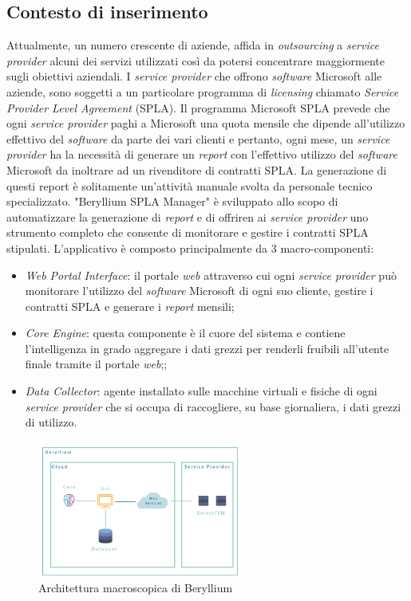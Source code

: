 \subsection{Contesto di inserimento}
Attualmente, un numero crescente di aziende, affida in \emph{outsourcing} a \emph{service provider} alcuni dei servizi utilizzati così da potersi concentrare maggiormente sugli obiettivi aziendali.
I \emph{service provider} che offrono \emph{software} Microsoft alle aziende, sono soggetti a un particolare programma di \emph{licensing} chiamato \emph{Service Provider Level Agreement} (SPLA).
Il programma Microsoft SPLA prevede che ogni \emph{service provider} paghi a Microsoft una quota mensile che dipende all'utilizzo effettivo del \emph{software} da parte dei vari clienti e pertanto, ogni mese, un \emph{service provider} ha la necessità di generare un \emph{report} con l'effettivo utilizzo del \emph{software} Microsoft da inoltrare ad un rivenditore di contratti SPLA.
La generazione di questi report è solitamente un'attività manuale svolta da personale tecnico specializzato. 
"Beryllium SPLA Manager" è sviluppato allo scopo di automatizzare la generazione di \emph{report} e di offriren ai \emph{service provider} uno strumento completo che consente di monitorare e gestire i contratti SPLA stipulati.
L'applicativo è composto principalmente da 3 macro-componenti:
\begin{itemize}
    \item \emph{Web Portal Interface}: il portale \emph{web} attraverso cui ogni \emph{service provider} può monitorare l'utilizzo del \emph{software} Microsoft di ogni suo cliente, gestire i contratti SPLA e generare i \emph{report} mensili;
    \item \emph{Core Engine}: questa componente è il cuore del sistema e contiene
    l'intelligenza in grado aggregare i dati grezzi per renderli fruibili all'utente finale tramite il portale \emph{web};;
    \item \emph{Data Collector}: agente installato sulle macchine virtuali e fisiche di ogni \emph{service provider} che si occupa di raccogliere, su base giornaliera, i dati grezzi di utilizzo.
\end{itemize}
     \begin{figure}[H]
        \centering
        \captionsetup{justification=centering,margin=2cm}
            \includegraphics[width=0.6\textwidth ]{figures/Beryllium.png}
            \caption [Architettura macroscopica di Beryllium]{Architettura macroscopica di Beryllium \label{fig:Beryllium}}
    \end{figure}
